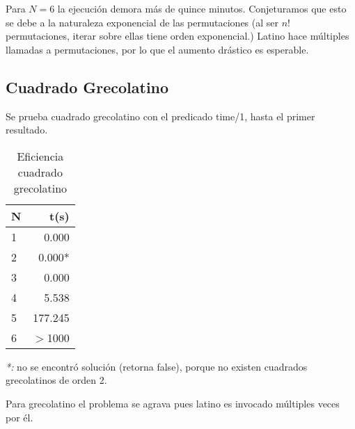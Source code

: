 \documentclass[]{article}
\begin{document}
Para $N=6$ la ejecución demora más de quince minutos. Conjeturamos que esto se debe a la naturaleza exponencial de las permutaciones (al ser $n!$ permutaciones, iterar sobre ellas tiene orden exponencial.) Latino hace múltiples llamadas a permutaciones, por lo que el aumento drástico es esperable.

\newpage
\subsection{Cuadrado Grecolatino}

Se prueba cuadrado grecolatino con el predicado time/1, hasta el primer resultado.

\begin{table}[h!]
	\begin{center}
		\caption{Eficiencia cuadrado grecolatino}
		\label{tab:table1}
		\begin{tabular}{l|r} %
			\textbf{N} & \textbf{t(s)}\\
			\hline
			1 & 0.000 \\
			2 & 0.000* \\
			3 & 0.000 \\
			4 & 5.538 \\
			5 & 177.245 \\
			6 & $>$1000 \\		
		\end{tabular}
	\end{center}
\end{table}

\emph{*:} no se encontró solución (retorna false), porque no existen cuadrados grecolatinos de orden 2.

Para grecolatino el problema se agrava pues latino es invocado múltiples veces por él.
\end{document}
